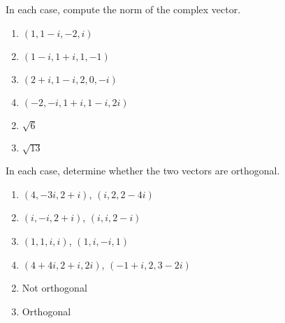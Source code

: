 \begin{multicols}{2}
\begin{ex}
In each case, compute the norm of the complex vector.


\begin{enumerate}[label={\alph*.}]
\item $(1, 1 - i, -2, i)$

\item $(1 - i, 1 + i, 1, -1)$

\item $(2 + i, 1 - i, 2, 0, -i)$

\item $(-2, -i, 1 + i, 1 - i, 2i)$

\end{enumerate}
\begin{sol}
\begin{enumerate}[label={\alph*.}]
\setcounter{enumi}{1}
\item  $\sqrt{6}$

\setcounter{enumi}{3}
\item  $\sqrt{13}$

\end{enumerate}
\end{sol}
\end{ex}

\begin{ex}
In each case, determine whether the two vectors are orthogonal.


\begin{enumerate}[label={\alph*.}]
\item $(4, -3i, 2 + i)$, $(i, 2, 2 - 4i)$

\item $(i, -i, 2 + i)$, $(i, i, 2 - i)$

\item $(1, 1, i, i)$, $(1, i, -i, 1)$

\item $(4 + 4i, 2 + i, 2i)$, $(-1 + i, 2, 3 - 2i)$

\end{enumerate}
\begin{sol}
\begin{enumerate}[label={\alph*.}]
\setcounter{enumi}{1}
\item  Not orthogonal

\setcounter{enumi}{3}
\item  Orthogonal

\end{enumerate}
\end{sol}
\end{ex}


\end{multicols}
